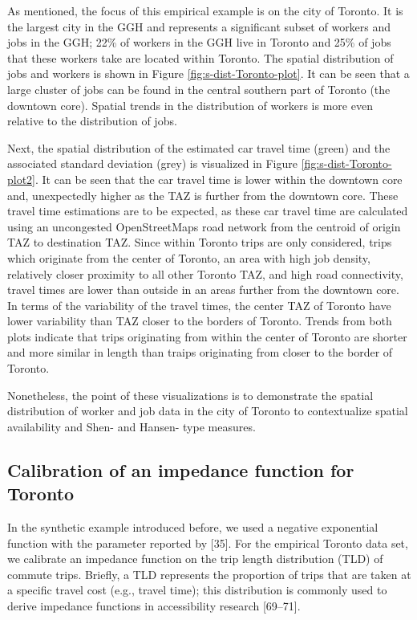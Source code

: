 \documentclass[10pt,letterpaper]{article}
\begin{document}
As mentioned, the focus of this empirical example is on the city of
Toronto. It is the largest city in the GGH and represents a significant
subset of workers and jobs in the GGH; 22\% of workers in the GGH live
in Toronto and 25\% of jobs that these workers take are located within
Toronto. The spatial distribution of jobs and workers is shown in Figure
\ref{fig:s-dist-Toronto-plot}. It can be seen that a large cluster of
jobs can be found in the central southern part of Toronto (the downtown
core). Spatial trends in the distribution of workers is more even
relative to the distribution of jobs.

Next, the spatial distribution of the estimated car travel time (green)
and the associated standard deviation (grey) is visualized in Figure
\ref{fig:s-dist-Toronto-plot2}. It can be seen that the car travel time
is lower within the downtown core and, unexpectedly higher as the TAZ is
further from the downtown core. These travel time estimations are to be
expected, as these car travel time are calculated using an uncongested
OpenStreetMaps road network from the centroid of origin TAZ to
destination TAZ. Since within Toronto trips are only considered, trips
which originate from the center of Toronto, an area with high job
density, relatively closer proximity to all other Toronto TAZ, and high
road connectivity, travel times are lower than outside in an areas
further from the downtown core. In terms of the variability of the
travel times, the center TAZ of Toronto have lower variability than TAZ
closer to the borders of Toronto. Trends from both plots indicate that
trips originating from within the center of Toronto are shorter and more
similar in length than traips originating from closer to the border of
Toronto.

Nonetheless, the point of these visualizations is to demonstrate the
spatial distribution of worker and job data in the city of Toronto to
contextualize spatial availability and Shen- and Hansen- type measures.

\hypertarget{calibration-of-an-impedance-function-for-toronto}{%
\subsection{Calibration of an impedance function for
Toronto}\label{calibration-of-an-impedance-function-for-toronto}}

In the synthetic example introduced before, we used a negative
exponential function with the parameter reported by {[}35{]}. For the
empirical Toronto data set, we calibrate an impedance function on the
trip length distribution (TLD) of commute trips. Briefly, a TLD
represents the proportion of trips that are taken at a specific travel
cost (e.g., travel time); this distribution is commonly used to derive
impedance functions in accessibility research {[}69--71{]}.
\end{document}
